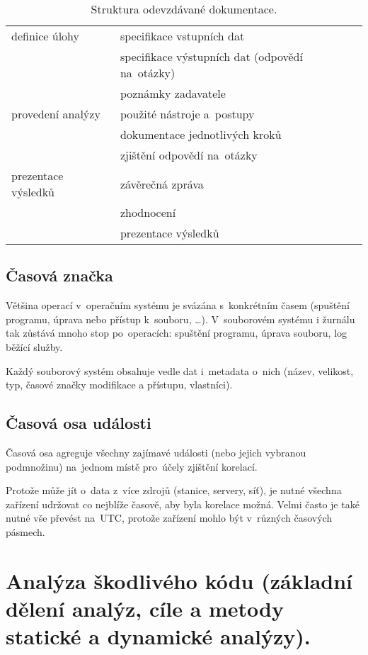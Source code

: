 \begin{table}[ht]
\centering
\onehalfspacing
\begin{tabular}{ll}
definice úlohy
& specifikace vstupních dat \\
& specifikace výstupních dat (odpovědí na~otázky) \\
& poznámky zadavatele \\
\hline
provedení analýzy
& použité nástroje a~postupy \\
& dokumentace jednotlivých kroků \\
& zjištění odpovědí na~otázky \\
\hline
prezentace výsledků
& závěrečná zpráva \\
& zhodnocení \\
& prezentace výsledků \\
\end{tabular}
\caption{Struktura odevzdávané dokumentace.}
\end{table}
\FloatBarrier


\subsection{Časová značka}

Většina operací v~operačním systému je svázána s~konkrétním časem (spuštění programu, úprava nebo přístup k~souboru, \dots).
V~souborovém systému i žurnálu tak zůstává mnoho stop po~operacích: spuštění programu, úprava souboru, log běžící služby.

Každý souborový systém obsahuje vedle dat i~metadata o~nich (název, velikost, typ, časové značky modifikace a přístupu, vlastníci).


\subsection{Časová osa události}

Časová osa agreguje všechny zajímavé události (nebo jejich vybranou podmnožinu) na~jednom místě pro~účely zjištění korelací.

Protože může jít o~data z~více zdrojů (stanice, servery, síť), je nutné všechna zařízení udržovat co nejblíže časově, aby byla korelace možná.
Velmi často je také nutné vše převést na~UTC, protože zařízení mohlo být v~různých časových pásmech.


\clearpage
\section{Analýza škodlivého kódu (základní dělení analýz, cíle a metody statické a dynamické analýzy).}

